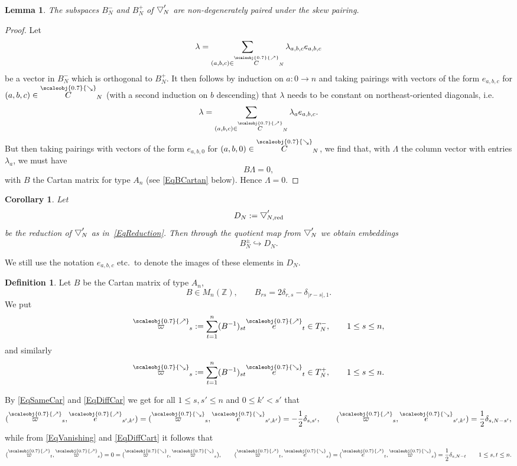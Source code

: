 \documentclass[11pt, reqno]{amsart}
\newtheorem{lemma}[theorem]{Lemma}
\newtheorem{cor}[theorem]{Corollary}
\theoremstyle{definition}
\newtheorem{defn}[theorem]{Definition}
\numberwithin{equation}{section}
\def\Z{\mathbb Z}
\newcommand{\Bor}{B}
\newcommand{\Tor}{T}
\newcommand{\nears}{\scaleobj{0.7}{\nearrow}}
\newcommand{\sears}{\scaleobj{0.7}{\searrow}}
\newcommand{\nee}{\overset{\nears}{e}}
\newcommand{\seee}{\overset{\sears}{e}}
\newcommand{\neC}{\overset{\nears}{C}}
\newcommand{\seC}{\overset{\sears}{C}}
\newcommand{\nevarpi}{\overset{\nears}{\varpi}}
\newcommand{\sevarpi}{\overset{\sears}{\varpi}}
\newcommand{\wbtd}[1]{\raisebox{\depth}{$\bigtriangledown'$\!\!}_{#1}}
\newcommand{\redu}{\mathrm{red}}
\begin{document}
\begin{lemma}\label{LemNonDegPair}
The subspaces $\Bor_N^-$ and $\Bor_N^+$ of $\wbtd{N}$ are non-degenerately paired under the skew pairing.
\end{lemma}
\begin{proof}
Let
\[
\lambda = \sum_{(a,b,c)\in \neC_N} \lambda_{a,b,c}e_{a,b,c}
\]
be a vector in $\Bor_N^-$ which is orthogonal to $\Bor_N^+$. It then follows by induction on $a\colon0 \rightarrow n$ and taking pairings with vectors of the form $e_{a,b,c}$ for $(a,b,c)\in \seC_N$ (with a second induction on  $b$ descending) that $\lambda$ needs to be constant on northeast-oriented diagonals, i.e.\ 
\[
\lambda = \sum_{(a,b,c)\in \neC_N} \lambda_a e_{a,b,c}. 
\]
But then taking pairings with vectors of the form $e_{a,b,0}$ for $(a,b,0) \in \seC_N$, we find that, with $\Lambda$ the column vector with entries $\lambda_a$, we must have  
\[
B \Lambda =0,
\] 
with $B$ the Cartan matrix for type $A_n$ (see \eqref{EqBCartan} below). Hence $\Lambda=0$.
\end{proof}

\begin{cor}\label{CorHeisDeg}
Let 
\begin{equation}\label{EqDegHeisDoub}
D_N := \textrm{\raisebox{\depth}{$\bigtriangledown'$\!\!}}_{N,\redu}
\end{equation}
be the reduction of $\wbtd{N}$ as in~\eqref{EqReduction}. Then through the quotient map from $\wbtd{N}$ we obtain embeddings
\[
\Bor_N^{\pm}\hookrightarrow D_N.
\]
\end{cor}
We still use the notation $e_{a,b,c}$ etc.\ to denote the images of these elements in $D_N$. 

\begin{defn}
Let $B$ be the Cartan matrix of type $A_n$, 
\begin{equation}\label{EqBCartan}
B \in M_n(\Z),\qquad B_{rs} = 2 \delta_{r,s} - \delta_{|r-s|,1}.
\end{equation}
We put 
\begin{equation}\label{EqFundWeightUp}
\nevarpi_s := \sum_{t=1}^n (B^{-1})_{st} \nee_t \in \Tor_N^-,\qquad 1\leq s \leq n,
\end{equation}
and similarly 
\begin{equation}\label{EqFundWeightDown}
\sevarpi_s := \sum_{t=1}^n (B^{-1})_{st} \seee_t \in \Tor_N^+,\qquad 1\leq s \leq n.
\end{equation}
\end{defn}

By \eqref{EqSameCar} and \eqref{EqDiffCar} we get for all $1\leq s,s'\leq n$ and $0\leq k' < s'$ that 
\begin{equation}\label{EqPairFundWeight}
(\nevarpi_s,\nee_{s',k'}) = (\sevarpi_s,\seee_{s',k'}) = -\frac{1}{2}\delta_{s,s'},\qquad (\nevarpi_s,\seee_{s',k'}) = \frac{1}{2}\delta_{s,N-s'},
\end{equation}
while from \eqref{EqVanishing} and \eqref{EqDiffCart} it follows that 
\begin{equation}\label{EqOrthogonalWeights}
(\nevarpi_t,\nevarpi_s)=0 = (\sevarpi_t,\sevarpi_s),\qquad (\nevarpi_t,\seee_s)  = (\nee_t,\sevarpi_s) = \frac{1}{2}\delta_{s,N-t}\qquad 1\leq s,t\leq n.
\end{equation}
\end{document}
